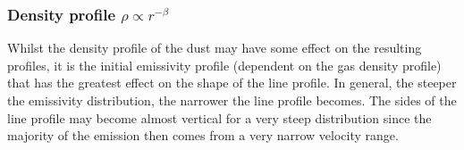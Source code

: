 \documentclass[useAMS,usenatbib,usegraphicx]{mnras}
\begin{document}











\subsubsection{Density profile $\rho \propto r^{-\beta}$}
\label{beta}

Whilst the density profile of the dust may have some effect on the 
resulting profiles, it is the initial emissivity profile (dependent on the 
gas density profile) that has the greatest effect on the shape of 
the line profile.  In general, the steeper the emissivity distribution, the narrower the line 
profile becomes.  The sides of the line profile may become almost vertical 
for a very steep distribution since the majority of the emission then 
comes from a very narrow velocity range.  
\end{document}
